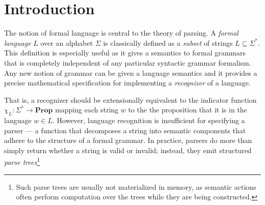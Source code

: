 \documentclass[sigconf,anonymous,review,screen]{acmart}
\newcommand{\String}{\Sigma^{*}}
\newcommand{\Prop}{\mathbf{Prop}}
\begin{document}
\setcounter{page}{1}

\section{Introduction}
The notion of formal language is central to the theory of parsing. A
\emph{formal language} $L$ over an alphabet $\Sigma$ is classically defined as a
\emph{subset} of strings $L \subseteq \String$. This definition is
especially useful as it gives a semantics to formal grammars that is completely
independent of any particular syntactic grammar formalism. Any new
notion of grammar can be given a language semantics and it provides a precise
mathematical specification for implementing a \emph{recognizer} of a language.

That is, a recognizer should be extensionally equivalent to the indicator function
$\chi_{L} : \String \to \Prop$ mapping each string $w$ to the the proposition
that it is in the language $w \in L$. However, language recognition is
insufficient for specifying a parser --- a function that decomposes a string
into semantic components that adhere to the structure of a formal grammar. In
practice, parsers do more than simply return whether a string is valid or
invalid; instead, they emit structured \emph{parse trees}\footnote{Such parse
  trees are usually not materialized in memory, as semantic actions often perform
  computation over the trees while they are being constructed.}




\end{document}
